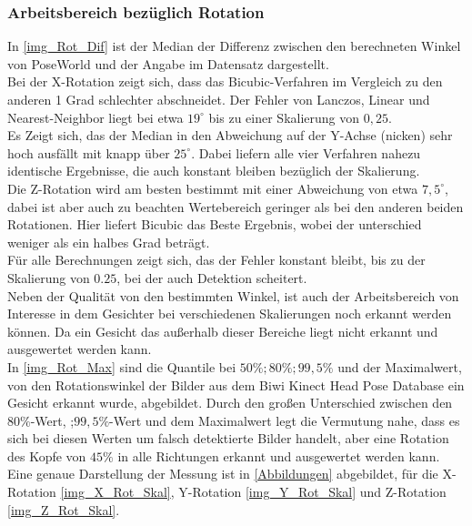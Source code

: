 \subsubsection{Arbeitsbereich bezüglich Rotation}
In \autoref{img_Rot_Dif} ist der Median der Differenz zwischen den berechneten Winkel von PoseWorld und der Angabe im Datensatz dargestellt.\\
Bei der X-Rotation zeigt sich, dass das Bicubic-Verfahren im Vergleich zu den anderen 1 Grad schlechter abschneidet. Der Fehler von Lanczos, Linear und Nearest-Neighbor liegt bei etwa $19^\circ$ bis zu einer Skalierung von $0,25$.\\
Es Zeigt sich, das der Median in den Abweichung auf der Y-Achse (nicken) sehr hoch ausfällt mit knapp über $25^\circ$. 
Dabei liefern alle vier Verfahren nahezu identische Ergebnisse, die auch konstant bleiben bezüglich der Skalierung.\\
Die Z-Rotation wird am besten bestimmt mit einer Abweichung von etwa $7,5^\circ$, dabei ist aber auch zu beachten Wertebereich geringer als bei den anderen beiden Rotationen.
Hier liefert Bicubic das Beste Ergebnis, wobei der unterschied weniger als ein halbes Grad beträgt.\\
Für alle Berechnungen zeigt sich, das der Fehler konstant bleibt, bis zu der Skalierung von $0.25$, bei der auch Detektion scheitert.\\
Neben der Qualität von den bestimmten Winkel, ist auch der Arbeitsbereich von Interesse in dem Gesichter bei verschiedenen Skalierungen noch erkannt werden können. Da ein Gesicht das außerhalb dieser Bereiche liegt nicht erkannt und ausgewertet werden kann.\\
In \autoref{img_Rot_Max} sind die Quantile bei $50\%;80\%;99,5\%$ und der Maximalwert, von den Rotationswinkel der Bilder aus dem Biwi Kinect Head Pose Database \cite{BIWI_database} ein Gesicht erkannt wurde, abgebildet. Durch den großen Unterschied zwischen den $80\%$-Wert, ;$99,5\%$-Wert und dem Maximalwert legt die Vermutung nahe, dass es sich bei diesen Werten um falsch detektierte Bilder handelt, aber eine Rotation des Kopfe von $45\%$ in alle Richtungen erkannt und ausgewertet werden kann.\\
Eine genaue Darstellung der Messung ist in \autoref{Abbildungen} abgebildet, für die X-Rotation \autoref{img_X_Rot_Skal}, Y-Rotation \autoref{img_Y_Rot_Skal} und Z-Rotation \autoref{img_Z_Rot_Skal}.
